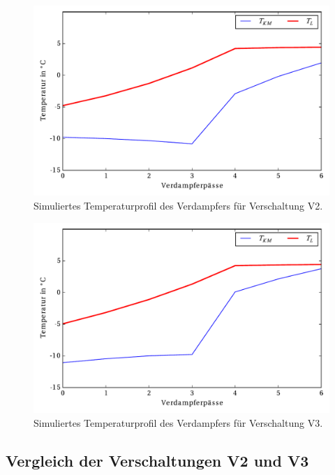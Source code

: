 \begin{figure}[h!]
\centering
\includegraphics[scale=0.8]{Pictures/Temp_V11.pdf}
\caption{Simuliertes Temperaturprofil des Verdampfers für Verschaltung V2.}
\label{fig:SimTempV1}
\end{figure}

\begin{figure}[h!]
\centering
\includegraphics[scale=0.8]{Pictures/Temp_V21.pdf}
\caption{Simuliertes Temperaturprofil des Verdampfers für Verschaltung V3.}
\label{fig:SimTempV2}
\end{figure}
\subsection{Vergleich der Verschaltungen V2 und V3}
\label{subsec:Vergleich der Verschaltungen V2 und V3}

